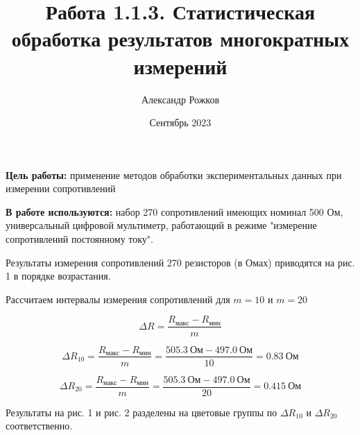 \documentclass[a4paper, 12pt]{article}
\title{Работа 1.1.3. Статистическая обработка результатов многократных измерений}
\author{Александр Рожков}
\date{Сентябрь 2023}
\begin{document}
    \maketitle

    \textbf{Цель работы:} применение методов обработки экспериментальных данных при измерении сопротивлений

    \textbf{В работе используются:} набор 270 сопротивлений имеющих номинал 500 Ом, универсальный цифровой мультиметр, работающий в режиме "измерение сопротивлений постоянному току".

    Результаты измерения сопротивлений 270 резисторов (в Омах) приводятся на рис. 1 в порядке возрастания.

    Рассчитаем интервалы измерения сопротивлений для $m = 10$ и $m = 20$

    \begin{equation*}
        \Delta R = \frac{R_{макс} - R_{мин}}{m}
    \end{equation*}

    \begin{equation*}
        \Delta R_{10} = \frac{R_{макс} - R_{мин}}{m} = \frac{505.3\ Ом - 497.0\ Ом}{10} = 0.83\ Ом
    \end{equation*}

    \begin{equation*}
        \Delta R_{20} = \frac{R_{макс} - R_{мин}}{m} = \frac{505.3\ Ом - 497.0\ Ом}{20} = 0.415\ Ом
    \end{equation*}

    Результаты на рис. 1 и рис. 2 разделены на цветовые группы по $\Delta R_{10}$ и $\Delta R_{20}$ соответственно.
\end{document}
